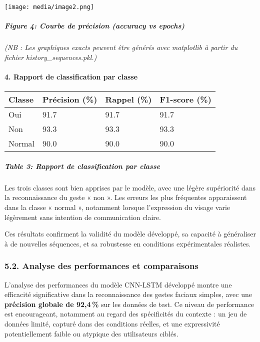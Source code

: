 \documentclass[
]{article}
\begin{document}
\texttt{[image: media/image2.png]}

\hypertarget{figure-4-courbe-de-pruxe9cision-accuracy-vs-epochs}{%
\subparagraph{Figure 4: Courbe de précision (accuracy vs epochs)}\label{figure-4-courbe-de-pruxe9cision-accuracy-vs-epochs}}

\emph{(NB : Les graphiques exacts peuvent être générés avec matplotlib à partir du fichier history\_sequences.pkl.)}

\hypertarget{rapport-de-classification-par-classe}{%
\paragraph{\texorpdfstring{\textbf{4. Rapport de classification par classe}}{4. Rapport de classification par classe}}\label{rapport-de-classification-par-classe}}

\begin{longtable}[]{@{}llll@{}}
\toprule
\textbf{Classe} & \textbf{Précision (\%)} & \textbf{Rappel (\%)} & \textbf{F1-score (\%)} \\
\midrule
\endhead
Oui & 91.7 & 91.7 & 91.7 \\
Non & 93.3 & 93.3 & 93.3 \\
Normal & 90.0 & 90.0 & 90.0 \\
\bottomrule
\end{longtable}

\hypertarget{table-3-rapport-de-classification-par-classe}{%
\subparagraph{Table 3: Rapport de classification par classe}\label{table-3-rapport-de-classification-par-classe}}

Les trois classes sont bien apprises par le modèle, avec une légère supériorité dans la reconnaissance du geste « non ». Les erreurs les plus fréquentes apparaissent dans la classe « normal », notamment lorsque l'expression du visage varie légèrement sans intention de communication claire.

Ces résultats confirment la validité du modèle développé, sa capacité à généraliser à de nouvelles séquences, et sa robustesse en conditions expérimentales réalistes.

\hypertarget{analyse-des-performances-et-comparaisons}{%
\subsubsection{5.2. Analyse des performances et comparaisons}\label{analyse-des-performances-et-comparaisons}}

L'analyse des performances du modèle CNN-LSTM développé montre une efficacité significative dans la reconnaissance des gestes faciaux simples, avec une \textbf{précision globale de 92,4\,\%} sur les données de test. Ce niveau de performance est encourageant, notamment au regard des spécificités du contexte : un jeu de données limité, capturé dans des conditions réelles, et une expressivité potentiellement faible ou atypique des utilisateurs ciblés.
\end{document}
